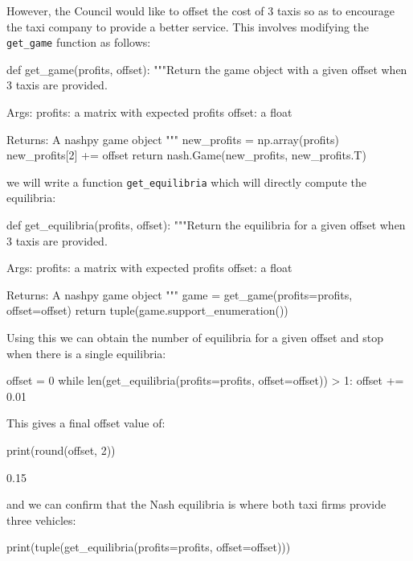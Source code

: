However, the Council would like to offset the cost of 3
taxis so as to encourage the taxi company to provide a better service. This
involves modifying the \texttt{get_game} function as follows:

\begin{pyin}
def get_game(profits, offset):
    """Return the game object with a given offset when 3 taxis
    are provided.

    Args:
        profits: a matrix with expected profits
        offset: a float

    Returns:
        A nashpy game object
    """
    new_profits = np.array(profits)
    new_profits[2] += offset
    return nash.Game(new_profits, new_profits.T)
\end{pyin}

we will write a function \texttt{get_equilibria} which will directly
compute the equilibria:

\begin{pyin}
def get_equilibria(profits, offset):
    """Return the equilibria for a given offset when 3 taxis
    are provided.

    Args:
        profits: a matrix with expected profits
        offset: a float

    Returns:
        A nashpy game object
    """
    game = get_game(profits=profits, offset=offset)
    return tuple(game.support_enumeration())
\end{pyin}


Using this we can obtain the number of equilibria for a given offset and stop
when there is a single equilibria:

\begin{pyin}
offset = 0
while len(get_equilibria(profits=profits, offset=offset)) > 1:
    offset += 0.01
\end{pyin}

This gives a final offset value of:

\begin{pyin}
print(round(offset, 2))
\end{pyin}


\begin{pyout}
0.15
\end{pyout}

and we can confirm that the Nash equilibria is where both taxi firms provide
three vehicles:

\begin{pyin}
print(tuple(get_equilibria(profits=profits, offset=offset)))
\end{pyin}

